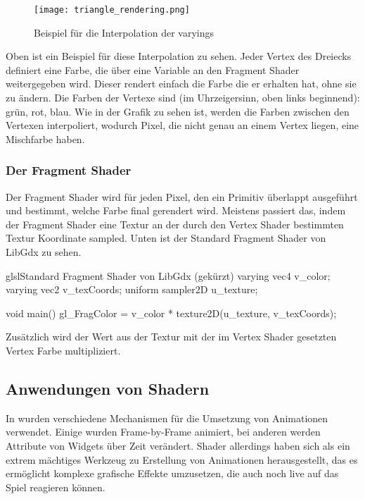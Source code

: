\begin{figure}[H]
    \centering
    \texttt{[image: triangle\_rendering.png]}
    \caption{Beispiel für die Interpolation der varyings}
\end{figure}

Oben ist ein Beispiel für diese Interpolation zu sehen.
Jeder Vertex des Dreiecks definiert eine Farbe, die über eine  Variable an den Fragment Shader
weitergegeben wird.
Dieser rendert einfach die Farbe die er erhalten hat, ohne sie zu ändern.
Die Farben der Vertexe sind (im Uhrzeigersinn, oben links beginnend): grün, rot, blau.
Wie in der Grafik zu sehen ist, werden die Farben zwischen den Vertexen interpoliert, wodurch Pixel, die nicht genau
an einem Vertex liegen, eine Mischfarbe haben.

\subsubsection{Der Fragment Shader}

Der Fragment Shader wird für jeden Pixel, den ein Primitiv überlappt ausgeführt und bestimmt, welche Farbe final
gerendert wird.
Meistens passiert das, indem der Fragment Shader eine Textur an der durch den Vertex Shader bestimmten Textur
Koordinate sampled.
Unten ist der Standard Fragment Shader von LibGdx zu sehen.

\begin{codeBlock}{glsl}{Standard Fragment Shader von LibGdx (gekürzt)}
varying vec4 v_color;
varying vec2 v_texCoords;
uniform sampler2D u_texture;

void main() {
    gl_FragColor = v_color * texture2D(u_texture, v_texCoords);
}
\end{codeBlock}

Zusätzlich wird der Wert aus der Textur mit der im Vertex Shader gesetzten Vertex Farbe multipliziert.

\subsection{Anwendungen von Shadern}

In \FF wurden verschiedene Mechanismen für die Umsetzung von Animationen verwendet.
Einige wurden Frame-by-Frame animiert, bei anderen werden Attribute von Widgets über Zeit verändert.
Shader allerdings haben sich als ein extrem mächtiges Werkzeug zu Erstellung von Animationen herausgestellt, das es
ermöglicht komplexe grafische Effekte umzusetzen, die auch noch live auf das Spiel reagieren können.

